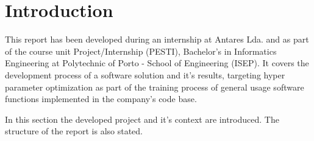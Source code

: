 
\section{Introduction}

This report has been developed during an internship at Antares Lda. and as part of the course unit Project/Internship (PESTI), Bachelor's in Informatics Engineering at Polytechnic of Porto - School of Engineering (ISEP). It covers the development process of a software solution and it's results, targeting hyper parameter optimization as part of the training process of general usage software functions implemented in the company's code base.

In this section the developed project and it's context are introduced. The structure of the report is also stated.





